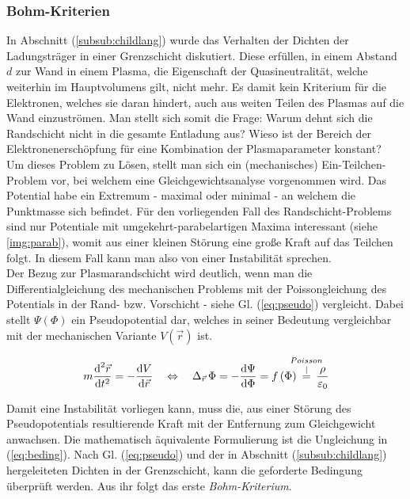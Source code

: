 \documentclass[numbers=noenddot,a4paper]{scrartcl}
\newcommand{\diff}{\textnormal{d}}
\newcommand{\ix}[1]{_\text{#1}}
\newcommand{\tilt}[1]{\textit{#1}}
\begin{document}
		\subsubsection{Bohm-Kriterien}

			In Abschnitt (\ref{subsub:childlang}) wurde das Verhalten der Dichten der Ladungstr\"ager in einer Grenzschicht diskutiert. Diese erf\"ullen, in einem Abstand $d$ zur Wand in einem Plasma, die Eigenschaft der Quasineutralit\"at, welche weiterhin im Hauptvolumens gilt, nicht mehr. Es damit kein Kriterium f\"ur die Elektronen, welches sie daran hindert, auch aus weiten Teilen des Plasmas auf die Wand einzustr\"omen. Man stellt sich somit die Frage: Warum dehnt sich die Randschicht nicht in die gesamte Entladung aus? Wieso ist der Bereich der Elektronenersch\"opfung f\"ur eine Kombination der Plasmaparameter konstant? \\
			Um dieses Problem zu L\"osen, stellt man sich ein (mechanisches) Ein-Teilchen-Problem vor, bei welchem eine Gleichgewichtsanalyse vorgenommen wird. Das Potential habe ein Extremum - maximal oder minimal - an welchem die Punktmasse sich befindet. F\"ur den vorliegenden Fall des Randschicht-Problems sind nur Potentiale mit umgekehrt-parabelartigen Maxima interessant (siehe \ref{img:parab}), womit aus einer kleinen St\"orung eine gro{\ss}e Kraft auf das Teilchen folgt. In diesem Fall kann man also von einer Instabilit\"at sprechen.\\
			Der Bezug zur Plasmarandschicht wird deutlich, wenn man die Differentialgleichung des mechanischen Problems mit der Poissongleichung des Potentials in der Rand- bzw. Vorschicht - siehe Gl. (\ref{eq:pseudo}) vergleicht. Dabei stellt $\Psi\left(\Phi\right)$ ein Pseudopotential dar, welches in seiner Bedeutung vergleichbar mit der mechanischen Variante $V\left(\vec{r}\right)$ ist.

				\begin{align}
					m\frac{\diff^{2}\vec{r}}{\diff t^{2}}=-\frac{\diff V}{\diff\vec{r}} \quad \Leftrightarrow \quad \Delta_{\vec{r}}\,\Phi=-\frac{\diff\Psi}{\diff\Phi}=f\left(\Phi\right)\hspace{-0.3cm}\overset{Poisson}{\overset{\mid}{=}}\hspace{-0.3cm}\frac{\rho}{\varepsilon\ix{0}} \label{eq:pseudo}
				\end{align}

			Damit eine Instabilit\"at vorliegen kann, muss die, aus einer St\"orung des Pseudopotentials resultierende Kraft mit der Entfernung zum Gleichgewicht anwachsen. Die mathematisch \"aquivalente Formulierung ist die Ungleichung  in (\ref{eq:beding}). Nach Gl. (\ref{eq:pseudo}) und der in Abschnitt (\ref{subsub:childlang}) hergeleiteten Dichten in der Grenzschicht, kann die geforderte Bedingung \"uberpr\"uft werden. Aus ihr folgt das erste \tilt{Bohm-Kriterium}.
\end{document}
